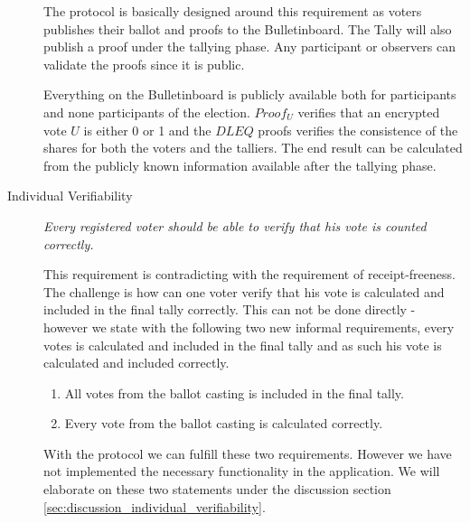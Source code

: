 \begin{description}
        \noindent
        The protocol is basically designed around this requirement as voters publishes their ballot and proofs to the Bulletinboard. The Tally will also publish a proof under the tallying phase. Any participant or observers can validate the proofs since it is public. 
        
        
        \noindent
        Everything on the Bulletinboard is publicly available both for participants and none participants of the election. $Proof_U$ verifies that an encrypted vote $U$ is either 0 or 1 and the $DLEQ$ proofs verifies the consistence of the shares for both the voters and the talliers. The end result can be calculated from the publicly known information available after the tallying phase. 
            
    \item[Individual Verifiability]
        \textit{Every registered voter should be able to verify that his vote is counted correctly.}
        
        This requirement is contradicting with the requirement of receipt-freeness. The challenge is how can one voter verify that his vote 
        is calculated and included in the final tally correctly. This can not be done directly - however we state with the following two new informal requirements, every votes is calculated and included in the final tally and as such his vote is calculated and included correctly.
        \begin{enumerate}
            \item All votes from the ballot casting is included in the final tally.
            \item Every vote from the ballot casting is calculated correctly.
        \end{enumerate}
        
        \noindent        
        With the protocol we can fulfill these two requirements. However we have not implemented the necessary functionality in the application.  We will elaborate on these two statements under the discussion section \ref{sec:discussion_individual_verifiability}. 
        
    \end{description}


